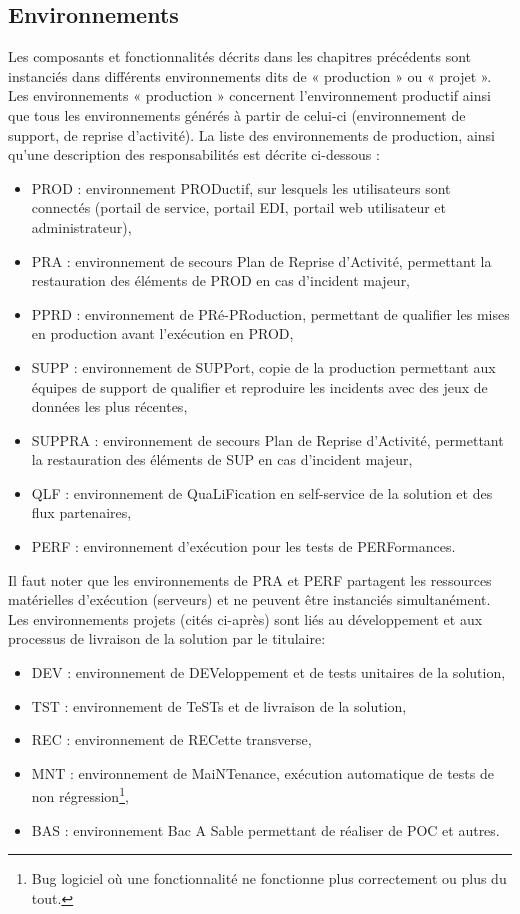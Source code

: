 \documentclass[12pt,a4paper]{article}
\begin{document}
\subsection{Environnements}
Les composants et fonctionnalités décrits dans les chapitres précédents sont instanciés dans différents environnements dits de « production » ou « projet ». Les environnements « production » concernent l’environnement productif ainsi que tous les environnements générés à partir de celui-ci (environnement de support, de reprise d’activité).
\smallbreak
La liste des environnements de production, ainsi qu’une description des responsabilités est décrite ci-dessous :
\smallbreak
\begin{itemize}
\item	PROD : environnement PRODuctif, sur lesquels les utilisateurs sont connectés (portail de service, portail EDI, portail web utilisateur et administrateur),
\item	PRA : environnement de secours Plan de Reprise d’Activité, permettant la restauration des éléments de PROD en cas d’incident majeur,
\item	PPRD : environnement de PRé-PRoduction, permettant de qualifier les mises en production avant l'exécution en PROD,
\item	SUPP : environnement de SUPPort, copie de la production permettant aux équipes de support de qualifier et reproduire les incidents avec des jeux de données les plus récentes,
\item	SUPPRA : environnement de secours Plan de Reprise d’Activité, permettant la restauration des éléments de SUP en cas d’incident majeur,
\item	QLF : environnement de QuaLiFication en self-service de la solution et des flux partenaires,
\item	PERF : environnement d’exécution pour les tests de PERFormances.
\end{itemize}
\medbreak
Il faut noter que les  environnements de PRA et PERF partagent les ressources matérielles d'exécution (serveurs) et ne peuvent être instanciés simultanément.
Les environnements projets (cités ci-après) sont liés au développement et aux processus de livraison de la solution par le titulaire: 
\smallbreak
\begin{itemize}
\item	DEV : environnement de DEVeloppement et de tests unitaires de la solution,
\item	TST : environnement de TeSTs et de livraison de la solution,
\item	REC : environnement de RECette transverse,
\item	MNT : environnement de MaiNTenance, exécution automatique de tests de non régression\footnote{Bug logiciel où une fonctionnalité ne fonctionne plus correctement ou plus du tout.},
\item	BAS : environnement Bac A Sable permettant de réaliser de POC et autres.
\end{itemize}
\end{document}
